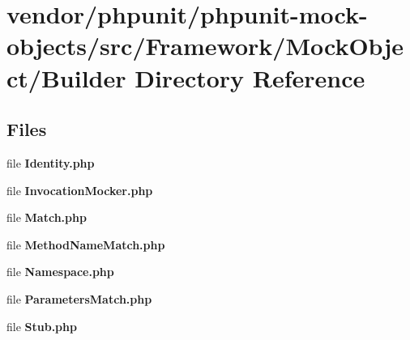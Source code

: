 \section{vendor/phpunit/phpunit-\/mock-\/objects/src/\+Framework/\+Mock\+Object/\+Builder Directory Reference}
\label{dir_6373a2f5749c55b03eb8f73959b70f58}
\subsection*{Files}
\begin{DoxyCompactItemize}
\item 
file {\bf Identity.\+php}
\item 
file {\bf Invocation\+Mocker.\+php}
\item 
file {\bf Match.\+php}
\item 
file {\bf Method\+Name\+Match.\+php}
\item 
file {\bf Namespace.\+php}
\item 
file {\bf Parameters\+Match.\+php}
\item 
file {\bf Stub.\+php}
\end{DoxyCompactItemize}
